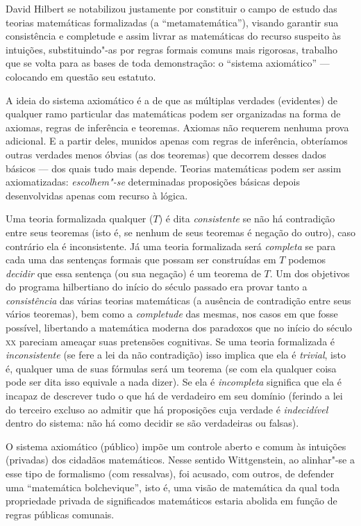 {David Hilbert se notabilizou justamente por constituir o
campo de estudo das teorias matemáticas formalizadas (a
``metamatemática''), visando
garantir sua consistência e completude e assim livrar as
matemáticas do recurso suspeito às intuições, substituindo"-as
por regras formais comuns mais rigorosas, trabalho que se volta
para as bases de toda demonstração: o ``sistema
axiomático'' --- colocando em questão seu
estatuto.

A ideia do sistema axiomático é a de que as múltiplas
verdades (evidentes) de qualquer ramo particular das matemáticas
podem ser organizadas na forma de axiomas, regras de inferência
e teoremas. Axiomas não requerem nenhuma prova adicional. E a
partir deles, munidos apenas com regras de inferência,
obteríamos outras verdades menos óbvias (as dos teoremas) que
decorrem desses dados básicos --- dos quais tudo mais depende.
Teorias matemáticas podem ser assim axiomatizadas:
\emph{escolhem"-se} determinadas proposições básicas depois
desenvolvidas apenas com recurso à lógica.

Uma teoria formalizada qualquer ($T$) é dita \emph{consistente}
se não há contradição entre seus teoremas (isto é, se nenhum de
seus teoremas é negação do outro), caso contrário ela é
inconsistente. Já uma teoria formalizada será \emph{completa}
se para cada uma das sentenças formais que possam ser
construídas em $T$ podemos \emph{decidir} que essa sentença (ou
sua negação) é um teorema de $T$. Um dos objetivos do programa
hilbertiano do início do século passado era provar tanto a
\emph{consistência} das várias teorias matemáticas (a ausência
de contradição entre seus vários teoremas), bem como a
\emph{completude} das mesmas, nos casos em que fosse possível,
libertando a matemática moderna dos paradoxos que no início do
século \textsc{xx} pareciam ameaçar suas pretensões cognitivas. Se
uma teoria formalizada é \emph{inconsistente} (se fere a lei
da não contradição) isso implica que ela é \emph{trivial},
isto é, qualquer uma de suas fórmulas será um teorema (se com
ela qualquer coisa pode ser dita isso equivale a nada dizer). Se
ela é \emph{incompleta} significa que ela é incapaz de
descrever tudo o que há de verdadeiro em seu domínio (ferindo a
lei do terceiro excluso ao admitir que há proposições cuja
verdade é \emph{indecidível} dentro do sistema: não há como
decidir se são verdadeiras ou falsas).

O sistema axiomático (público) impõe um controle aberto e comum
às intuições (privadas) dos cidadãos matemáticos. Nesse sentido
Wittgenstein, ao alinhar"-se a esse tipo de formalismo (com
ressalvas), foi acusado, com outros, de defender uma
``matemática bolchevique'', isto
é, uma visão de matemática da qual toda propriedade privada de
significados matemáticos estaria abolida em função de regras
públicas comunais.

}
